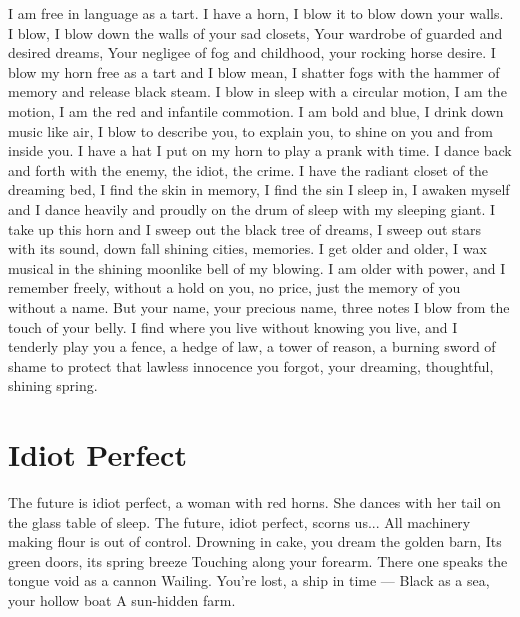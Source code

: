 \documentclass[english,11pt,letterpaper,onecolumn]{scrbook}
\begin{document}
\begin{poem}
\begin{stanza}
I am free in language as a tart. \verseline
I have a horn, I blow it to blow down your walls. \verseline
I blow, I blow down the walls of your sad closets, \verseline
Your wardrobe of guarded and desired dreams, \verseline
Your negligee of fog and childhood, your rocking horse desire. \verseline
I blow my horn free as a tart and I blow mean, \verseline
I shatter fogs with the hammer of memory and release black steam. \verseline
I blow in sleep with a circular motion, I am the motion, I am the red and infantile commotion. \verseline
I am bold and blue, I drink down music like air, I blow to describe you, to explain you, to shine on you and from inside you. \verseline
I have a hat I put on my horn to play a prank with time. \verseline
I dance back and forth with the enemy, the idiot, the crime. \verseline
I have the radiant closet of the dreaming bed, I find the skin in memory, I find the sin I sleep in, I awaken myself and I dance heavily and proudly on the drum of sleep with my sleeping giant. \verseline
I take up this horn and I sweep out the black tree of dreams, I sweep out stars with its sound, down fall shining cities, memories. \verseline
I get older and older, I wax musical in the shining moonlike bell of my blowing.  I am older with power, and I remember freely, without a hold on you, no price, just the memory of you without a name.  But your name, your precious name, three notes I blow from the touch of your belly. \verseline
I find where you live without knowing you live, and I tenderly play you a fence, a hedge of law, a tower of reason, a burning sword of shame to protect that lawless innocence you forgot, your dreaming, thoughtful, shining spring.
\end{stanza}
\end{poem}

\newpage
\section{Idiot Perfect}

\begin{poem}
\begin{stanza}
The future is idiot perfect, a woman with red horns. \verseline
She dances with her tail on the glass table of sleep. \verseline
The future, idiot perfect, scorns us... \verseline
All machinery making flour is out of control. \verseline
Drowning in cake, you dream the golden barn, \verseline
Its green doors, its spring breeze \verseline
Touching along your forearm. \verseline
There one speaks the tongue void as a cannon \verseline
Wailing.  You're lost, a ship in time --- \verseline
Black as a sea, your hollow boat \verseline
A sun-hidden farm.
\end{stanza}
\end{poem}
\end{document}
